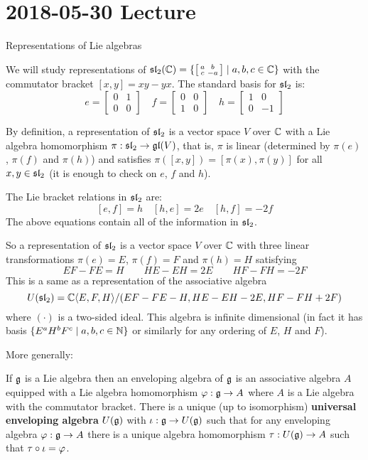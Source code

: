 \section{2018-05-30 Lecture}

Representations of Lie algebras

We will study representations of $\operatorname{\mathfrak{sl}}_2(\mathbb{C}) = \{
  \left[ \begin{smallmatrix}
    a & b \\ c & -a
  \end{smallmatrix} \right]
  \mid a,b,c \in \mathbb{C}
\}$
with the commutator bracket $[x,y]=xy-yx$.
The standard basis for $\operatorname{\mathfrak{sl}}_2$ is:
\begin{equation*}
  e=
  \begin{bmatrix}
    0 & 1 \\ 0 & 0
  \end{bmatrix}
  \quad
  f=
  \begin{bmatrix}
    0 & 0 \\ 1 & 0
  \end{bmatrix}
  \quad
  h=
  \begin{bmatrix}
    1 & 0 \\ 0 & -1
  \end{bmatrix}
\end{equation*}

By definition, a representation of $\operatorname{\mathfrak{sl}}_2$ is a vector space $V$ over $\mathbb{C}$ with a Lie algebra homomorphism $\pi: \operatorname{\mathfrak{sl}}_2 \to \operatorname{\mathfrak{gl}}(V)$, that is, $\pi$ is linear (determined by $\pi(e)$, $\pi(f)$ and $\pi(h)$) and satisfies $\pi([x,y])=[\pi(x),\pi(y)]$ for all $x,y \in \operatorname{\mathfrak{sl}}_2$ (it is enough to check on $e$, $f$ and $h$).

The Lie bracket relations in $\operatorname{\mathfrak{sl}}_2$ are:
\[ [e,f]=h \quad [h,e]=2e \quad [h,f]=-2f \]
The above equations contain all of the information in $\operatorname{\mathfrak{sl}}_2$.

So a representation of $\operatorname{\mathfrak{sl}}_2$ is a vector space $V$ over $\mathbb{C}$ with three linear transformations $\pi(e)=E$, $\pi(f)=F$ and $\pi(h)=H$ satisfying
\[ EF-FE=H \qquad HE-EH=2E \qquad HF-FH=-2F \]
This is a same as a representation of the associative algebra
\[ U(\operatorname{\mathfrak{sl}}_2) = \mathbb{C}{\left\langle E,F,H \right\rangle}/(EF-FE-H,HE-EH-2E,HF-FH+2F) \]
where $(\cdot)$ is a two-sided ideal.
This algebra is infinite dimensional (in fact it has basis $\{E^aH^bF^c \mid a,b,c \in \mathbb{N}\}$ or similarly for any ordering of $E$, $H$ and $F$).

More generally:
\begin{defn}
  If $\mathfrak{g}$ is a Lie algebra then an enveloping algebra of $\mathfrak{g}$ is an associative algebra $A$ equipped with a Lie algebra homomorphism $\varphi: \mathfrak{g} \to A$ where $A$ is a Lie algebra with the commutator bracket.
  There is a unique (up to isomorphism) \textbf{universal enveloping algebra} $U(\mathfrak{g})$ with $\iota: \mathfrak{g} \to U(\mathfrak{g})$ such that for any enveloping algebra $\varphi: \mathfrak{g} \to A$ there is a unique algebra homomorphism $\tau: U(\mathfrak{g}) \to A$ such that $\tau \circ \iota = \varphi$.
\end{defn}

